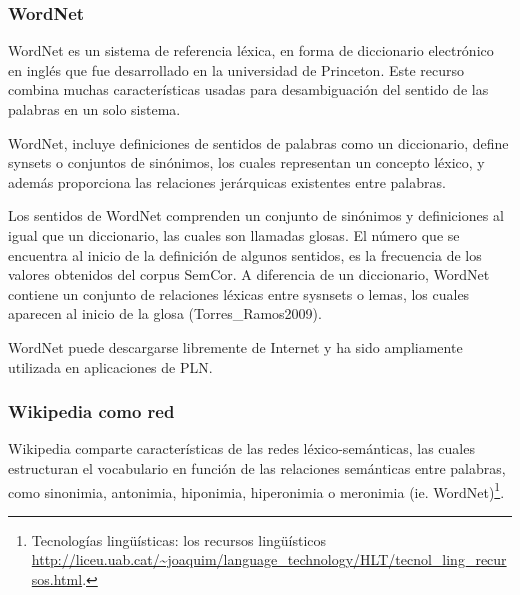 \documentclass[letterpaper]{article}
\newcommand\textstylebibuscitbase[1]{#1}
\begin{document}
\subsubsection[WordNet]{WordNet}
\hypertarget{RefHeading334657232820}{}
\bigskip

{\sffamily
WordNet es un sistema de referencia l\'exica, en forma de diccionario
electr\'onico en ingl\'es que fue desarrollado en la universidad de
Princeton. Este recurso combina muchas caracter\'isticas usadas para
desambiguaci\'on del sentido de las palabras en un solo sistema. }


\bigskip

{\sffamily
WordNet, incluye definiciones de sentidos de palabras como un
diccionario, define synsets o conjuntos de sin\'onimos, los cuales
representan un concepto l\'exico, y adem\'as proporciona las relaciones
jer\'arquicas existentes entre palabras. }


\bigskip

{\sffamily
Los sentidos de WordNet comprenden un conjunto de sin\'onimos y
definiciones al igual que un diccionario, las cuales son llamadas
glosas. El n\'umero que se encuentra al inicio de la definici\'on de
algunos sentidos, es la frecuencia de los valores obtenidos del corpus
SemCor. A diferencia de un diccionario, WordNet contiene un conjunto de
relaciones l\'exicas entre sysnsets o lemas, los cuales aparecen al
inicio de la glosa \textstylebibuscitbase{(Torres\_Ramos2009)}.}


\bigskip

{\sffamily
WordNet puede descargarse libremente de Internet y ha sido ampliamente
utilizada en aplicaciones de PLN.}


\bigskip

\subsubsection[Wikipedia como red]{Wikipedia como red}
\hypertarget{RefHeading10782782078703}{}
\bigskip

{\sffamily
Wikipedia comparte caracter\'isticas de las redes l\'exico-sem\'anticas,
las cuales estructuran el vocabulario en funci\'on de las relaciones
sem\'anticas entre palabras, como sinonimia, antonimia, hiponimia,
hiperonimia o meronimia (ie. WordNet)\footnote{Tecnolog\'ias
ling\"u\'isticas: los recursos ling\"u\'isticos
\url{http://liceu.uab.cat/~joaquim/language_technology/HLT/tecnol_ling_recursos.html}.}.}
\end{document}
